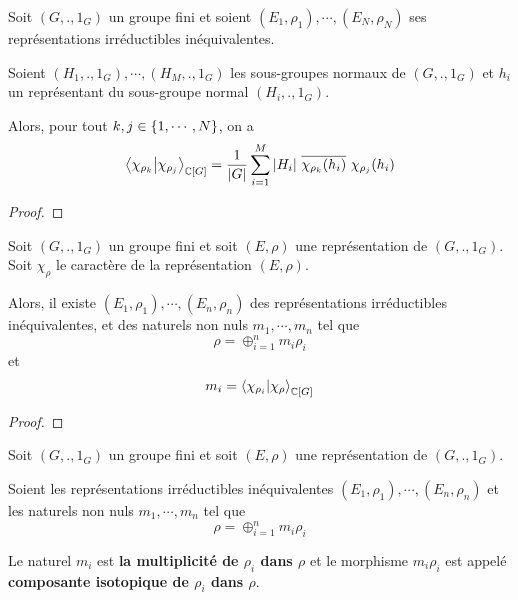 \begin{proposition}
	Soit $(G, ., 1_{G})$ un groupe fini et soient $(E_{1},
	\rho_{1}), \cdots, (E_{N}, \rho_{N})$ ses représentations
	irréductibles inéquivalentes.

	Soient $(H_{1}, ., 1_{G}), \cdots, (H_{M}, ., 1_{G})$ les sous-groupes
	normaux de $(G, ., 1_{G})$ et $h_{i}$ un représentant du sous-groupe normal
	$(H_{i}, ., 1_{G})$.

	Alors, pour tout $k, j \in \left\{ 1, \cdots, N \right\}$, on a
	\begin{equation}
		\bra{\chi_{\rho_{k}}}\ket{\chi_{\rho_{j}}}_{\mathbb{C}[G]} =
		\frac{1}{|G|} \sum_{i = 1}^{M} |H_{i}| \, \,
		\overline{\chi_{\rho_{k}}(h_{i})} \, \, \chi_{\rho_{j}}(h_{i})
	\end{equation}
\end{proposition}

\ifdefined\outputproof
\begin{proof}

\end{proof}
\fi

\begin{theorem}
	Soit $(G, ., 1_{G})$ un groupe fini et soit $(E, \rho)$
	une représentation de $(G, ., 1_{G})$.
	Soit $\chi_{\rho}$ le caractère de la représentation $(E, \rho)$.

	Alors, il existe $(E_{1}, \rho_{1}), \cdots, (E_{n},
	\rho_{n})$ des représentations irréductibles
	inéquivalentes, et des
	naturels non nuls $m_{1}, \cdots, m_{n}$ tel que
	\begin{equation}
		\rho = \oplus_{i = 1}^{n} m_{i} \rho_{i}
	\end{equation}
	et
	\begin{equation}
		m_{i} = \bra{\chi_{\rho_{i}}}\ket{\chi_{\rho}}_{\mathbb{C}[G]}
	\end{equation}
\end{theorem}

\ifdefined\outputproof
\begin{proof}

\end{proof}
\fi

\begin{definition}
	Soit $(G, ., 1_{G})$ un groupe fini et soit $(E, \rho)$
	une représentation de $(G, ., 1_{G})$.

	Soient les représentations irréductibles inéquivalentes $(E_{1},
	\rho_{1}), \cdots, (E_{n},
	\rho_{n})$ et les naturels non nuls $m_{1}, \cdots,
	m_{n}$ tel que
	\begin{equation}
		\rho = \oplus_{i = 1}^{n} m_{i} \rho_{i}
	\end{equation}

	Le naturel $m_{i}$ est \textbf{la multiplicité de $\rho_{i}$ dans $\rho$} et
	le morphisme $m_{i} \rho_{i}$ est appelé \textbf{composante isotopique de
		$\rho_{i}$ dans $\rho$}.
\end{definition}

